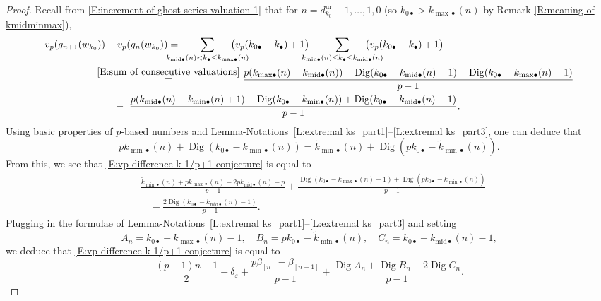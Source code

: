 \documentclass[12pt]{amsart}
\theoremstyle{definition}
\numberwithin{equation}{subsection}
\DeclareMathOperator{\Dig}{Dig}
\newcommand{\unr}{\mathrm{ur}}
\newcommand{\midd}{\mathrm{mid}}
\begin{document}
\begin{proof}
Recall from \eqref{E:increment of ghost series valuation 1} that for
$n = d_{k_0}^\unr -1,\dots,1, 0$ (so $k_{0\bullet} > k_{{\max}\bullet}(n)$ by Remark \ref{R:meaning of kmidminmax}),
\begin{eqnarray}
\label{E:vp difference k-1/p+1 conjecture}
\nonumber
 &v_p(g_{n+1}(w_{k_0})) - v_p(g_n(w_{k_0})) = \hspace{-15pt}\displaystyle\sum_{
k_{\midd\bullet}(n) < k_\bullet \leq k_{{\max}\bullet}(n)}
\hspace{-20pt}\big( v_p(k_{0\bullet} - k_\bullet)+1 \big)\ \,-  \hspace{-25pt} \displaystyle\sum_{
k_{{\min}\bullet}(n) \leq k_\bullet \leq k_{{\midd}\bullet}(n)}
\hspace{-20pt}\big( v_p(k_{0\bullet}-k_\bullet)+1 \big)
\\
&\qquad\qquad \quad
\stackrel{\eqref{E:sum of consecutive valuations}}= \dfrac{p(k_{{\max}\bullet}(n) - k_{\midd\bullet}(n)) - \Dig (k_{0\bullet}-k_{\midd\bullet}(n)-1)
+ \Dig(k_{0\bullet} - k_{{\max}\bullet}(n)-1)
}{p-1}
\\
\nonumber
& \qquad\qquad\qquad\quad -\ \dfrac{p(k_{{\midd}\bullet}(n) - k_{{\min}\bullet}(n)+1) - \Dig(k_{0\bullet} - k_{{\min}\bullet}(n)) + \Dig ( k_{0\bullet}- k_{\midd\bullet}(n)-1)
}{p-1}.
\end{eqnarray}
Using basic properties of $p$-based numbers and Lemma-Notations~\ref{L:extremal ks_part1}--\ref{L:extremal ks_part3}, one can deduce that
\begin{equation*}
pk_{{\min}\bullet}(n)+ \Dig(k_{0\bullet} - k_{{\min}\bullet}(n)) = \tilde k_{{\min}\bullet}(n)+ \Dig(pk_{0\bullet} - \tilde k_{{\min}\bullet}(n)).
\end{equation*}
From this, we see that \eqref{E:vp difference k-1/p+1 conjecture} is equal to
\begin{align*}
&\frac{\tilde k_{{\min}\bullet}(n) +pk_{{\max}\bullet}(n)- 2pk_{{\midd}\bullet}(n)-p}{p-1} + \frac{\Dig(k_{0\bullet}- k_{{\max}\bullet}(n)-1) + \Dig(pk_{0\bullet}  - \tilde k_{{\min}\bullet}(n))}{p-1}
\\
& \quad - \frac{2\Dig(k_{0\bullet}- k_{{\midd}\bullet}(n)-1)}{p-1}.
\end{align*}
Plugging in the formulae of Lemma-Notations~\ref{L:extremal ks_part1}--\ref{L:extremal ks_part3} and setting 
\[
A_n = k_{0\bullet}- k_{{\max}\bullet}(n)-1, \quad B_n = pk_{0\bullet}  - \tilde k_{{\min}\bullet}(n), \quad C_n = k_{0\bullet}- k_{{\midd}\bullet}(n)-1, 
\]
we deduce that \eqref{E:vp difference k-1/p+1 conjecture} is equal to
$$
\frac{(p-1)n-1}2 - \delta_\varepsilon +\frac{p\beta_{[n]} - \beta_{[n-1]}}{p-1}
+ \frac{\Dig A_n+\Dig B_n-2\Dig C_n}{p-1}.$$


\end{proof}
\end{document}
